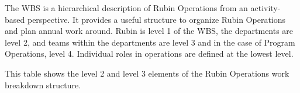 The \gls{WBS} is a hierarchical description of Rubin Operations from an activity-based perspective.
It provides a useful structure to organize Rubin Operations and plan annual work around.
Rubin is level 1 of the WBS, the departments are level 2, and teams within the departments are level 3 and in the case of Program Operations, level 4.
Individual roles in operations are defined at the lowest level.

This table shows the level 2 and level 3 elements of the Rubin Operations work breakdown structure.



